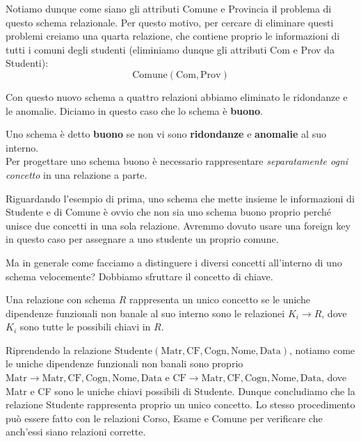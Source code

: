 \documentclass[11pt, a4paper, titlepage, oneside]{scrbook}
\begin{document}
Notiamo dunque come siano gli attributi Comune e Provincia il problema di questo schema relazionale. Per questo motivo, per cercare di eliminare questi problemi creiamo una quarta relazione, che contiene proprio le informazioni di tutti i comuni degli studenti (eliminiamo dunque gli attributi Com e Prov da Studenti):
\[
\text{Comune}(\text{Com}, \text{Prov})
\]

Con questo nuovo schema a quattro relazioni abbiamo eliminato le ridondanze e le anomalie. Diciamo in questo caso che lo schema è \textbf{buono}.

\begin{Definizione}
\label{def-schema-buono}
Uno schema è detto \textbf{buono} se non vi sono \textbf{ridondanze} e \textbf{anomalie} al suo interno. \\
Per progettare uno schema buono è necessario rappresentare \textit{separatamente ogni concetto} in una relazione a parte.
\end{Definizione}

Riguardando l'esempio di prima, uno schema che mette insieme le informazioni di Studente e di Comune è ovvio che non sia uno schema buono proprio perché unisce due concetti in una sola relazione. Avremmo dovuto usare una foreign key in questo caso per assegnare a uno studente un proprio comune.

Ma in generale come facciamo a distinguere i diversi concetti all'interno di uno schema velocemente? Dobbiamo sfruttare il concetto di chiave.

\begin{Proposizione}[]
\label{propos-distinguere-concetti-velocemente}
Una relazione con schema $R$ rappresenta un unico concetto se le uniche dipendenze funzionali non banale al suo interno sono le relazionei $K_i \longrightarrow R$, dove $K_i$ sono tutte le possibili chiavi in $R$.
\end{Proposizione}

Riprendendo la relazione $\text{Studente}(\text{Matr}, \text{CF}, \text{Cogn}, \text{Nome}, \text{Data})$, notiamo come le uniche dipendenze funzionali non banali sono proprio \mbox{$\text{Matr} \longrightarrow \text{Matr}, \text{CF}, \text{Cogn}, \text{Nome}, \text{Data}$} e \mbox{$\text{CF} \longrightarrow \text{Matr}, \text{CF}, \text{Cogn}, \text{Nome}, \text{Data}$}, dove Matr e CF sono le uniche chiavi possibili di Studente. Dunque concludiamo che la relazione Studente rappresenta proprio un unico concetto. Lo stesso procedimento può essere fatto con le relazioni Corso, Esame e Comune per verificare che anch'essi siano relazioni corrette.
\end{document}
